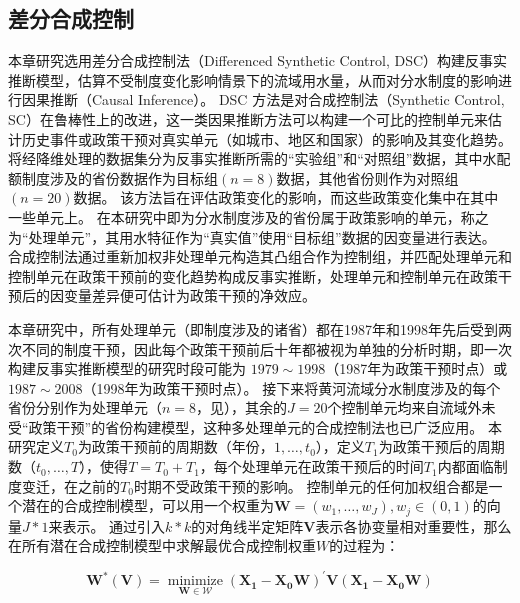 \subsection{差分合成控制}\label{sec:DSC}

本章研究选用差分合成控制法（Differenced Synthetic Control, DSC）构建反事实推断模型，估算不受制度变化影响情景下的流域用水量，从而对分水制度的影响进行因果推断（Causal Inference）。
DSC 方法是对合成控制法（Synthetic Control, SC）在鲁棒性上的改进\cite{billmeier2013, smith2015}，这一类因果推断方法可以构建一个可比的控制单元来估计历史事件或政策干预对真实单元（如城市、地区和国家）的影响及其变化趋势\cite{abadie2010, abadie2015, hill2021}。
将经降维处理的数据集分为反事实推断所需的“实验组”和“对照组”数据，其中水配额制度涉及的省份数据作为目标组$(n=8)$数据，其他省份则作为对照组$(n=20)$数据。
该方法旨在评估政策变化的影响，而这些政策变化集中在其中一些单元上。
在本研究中即为分水制度涉及的省份属于政策影响的单元，称之为“处理单元”，其用水特征作为“真实值”使用“目标组”数据的因变量进行表达。
合成控制法通过重新加权非处理单元构造其凸组合作为控制组，并匹配处理单元和控制单元在政策干预前的变化趋势构成反事实推断，处理单元和控制单元在政策干预后的因变量差异便可估计为政策干预的净效应。

本章研究中，所有处理单元（即制度涉及的诸省）都在1987年和1998年先后受到两次不同的制度干预，因此每个政策干预前后十年都被视为单独的分析时期，即一次构建反事实推断模型的研究时段可能为 $1979 \sim 1998$（1987年为政策干预时点）或 $1987 \sim 2008$（1998年为政策干预时点）。
接下来将黄河流域分水制度涉及的每个省份分别作为处理单元（$n=8$，见），其余的$J=20$个控制单元均来自流域外未受“政策干预”的省份构建模型，这种多处理单元的合成控制法也已广泛应用\cite{abadie2021}。
本研究定义$T_0$为政策干预前的周期数（年份，$1,\ldots,t_0$），定义$T_1$为政策干预后的周期数（$t_0,\ldots,T$），使得$T = T_0+ T_1$，每个处理单元在政策干预后的时间$T_1$内都面临制度变迁，在之前的$T_0$时期不受政策干预的影响。
控制单元的任何加权组合都是一个潜在的合成控制模型，可以用一个权重为$\mathbf{W} = (w_{1},\ldots,w_{J}), w_j \in (0, 1)$的向量$J * 1$来表示。
通过引入$k * k$的对角线半定矩阵$\mathbf{V}$表示各协变量相对重要性，那么在所有潜在合成控制模型中求解最优合成控制权重$W$的过程为：

\begin{equation}
    \mathbf{W^{*}(V)}=\underset{\mathbf{W} \in \mathcal{W}}{\operatorname{minimize}}{\left(\mathbf{X}_{\mathbf{1}}-\mathbf{X}_{\mathbf{0}} \mathbf{W}\right)}^{\prime} {\mathbf{V}}{\left(\mathbf{X}_{\mathbf{1}}-\mathbf{X}_{\mathbf{0}} \mathbf{W}\right)}
\end{equation}

